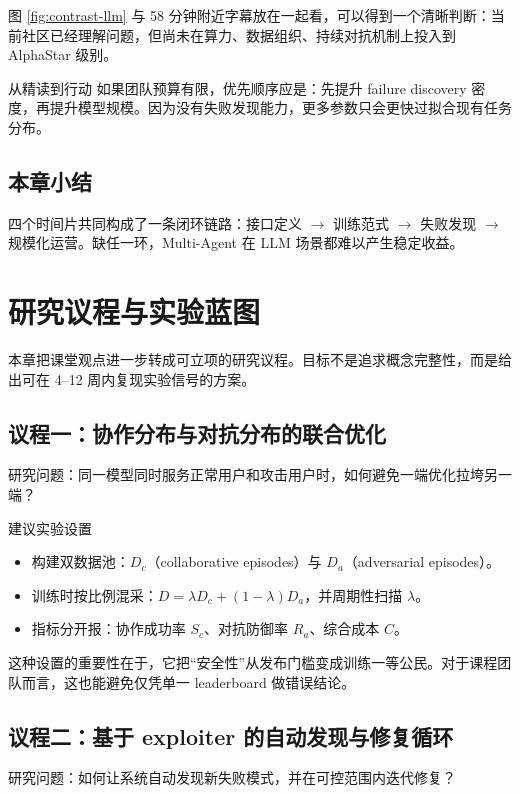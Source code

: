 \documentclass[a4paper]{article}
\begin{document}
图 \ref{fig:contrast-llm} 与 58 分钟附近字幕放在一起看，可以得到一个清晰判断：当前社区已经理解问题，但尚未在算力、数据组织、持续对抗机制上投入到 AlphaStar 级别。

\begin{warningbox}{从精读到行动}
如果团队预算有限，优先顺序应是：先提升 failure discovery 密度，再提升模型规模。因为没有失败发现能力，更多参数只会更快过拟合现有任务分布。
\end{warningbox}

\subsection{本章小结}
四个时间片共同构成了一条闭环链路：接口定义 $\rightarrow$ 训练范式 $\rightarrow$ 失败发现 $\rightarrow$ 规模化运营。缺任一环，Multi-Agent 在 LLM 场景都难以产生稳定收益。

\section{研究议程与实验蓝图}

本章把课堂观点进一步转成可立项的研究议程。目标不是追求概念完整性，而是给出可在 4--12 周内复现实验信号的方案。

\subsection{议程一：协作分布与对抗分布的联合优化}
研究问题：同一模型同时服务正常用户和攻击用户时，如何避免一端优化拉垮另一端？

\begin{knowledgebox}{建议实验设置}
\begin{itemize}
    \item 构建双数据池：$D_c$（collaborative episodes）与 $D_a$（adversarial episodes）。
    \item 训练时按比例混采：$D = \lambda D_c + (1-\lambda)D_a$，并周期性扫描 $\lambda$。
    \item 指标分开报：协作成功率 $S_c$、对抗防御率 $R_a$、综合成本 $C$。
\end{itemize}
\end{knowledgebox}

这种设置的重要性在于，它把``安全性''从发布门槛变成训练一等公民。对于课程团队而言，这也能避免仅凭单一 leaderboard 做错误结论。

\subsection{议程二：基于 exploiter 的自动发现与修复循环}
研究问题：如何让系统自动发现新失败模式，并在可控范围内迭代修复？
\end{document}
